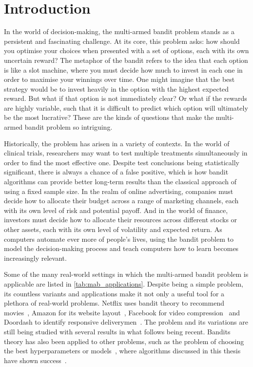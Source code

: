 \chapter{Introduction}
In the world of decision-making, the multi-armed bandit problem stands as a persistent and fascinating challenge.
At its core, this problem asks: how should you optimise your choices when presented with a set of options, each with its own uncertain reward?
The metaphor of the bandit refers to the idea that each option is like a slot machine, where you must decide how much to invest in each one in order to maximise your winnings over time.
One might imagine that the best strategy would be to invest heavily in the option with the highest expected reward.
But what if that option is not immediately clear?
Or what if the rewards are highly variable, such that it is difficult to predict which option will ultimately be the most lucrative?
These are the kinds of questions that make the multi-armed bandit problem so intriguing.

Historically, the problem has arisen in a variety of contexts.
In the world of clinical trials, researchers may want to test multiple treatments simultaneously in order to find the most effective one.
Despite test conclusions being statistically significant, there is always a chance of a false positive, which is how bandit algorithms can provide better long-term results than the classical approach of using a fixed sample size.
In the realm of online advertising, companies must decide how to allocate their budget across a range of marketing channels, each with its own level of risk and potential payoff.
And in the world of finance, investors must decide how to allocate their resources across different stocks or other assets, each with its own level of volatility and expected return.
As computers automate ever more of people's lives, using the bandit problem to model the decision-making process and teach computers how to learn becomes increasingly relevant.

Some of the many real-world settings in which the multi-armed bandit problem is applicable are listed in \cref{tab:mab_applications}.
Despite being a simple problem, its countless variants and applications make it not only a useful tool for a plethora of real-world problems.
Netflix uses bandit theory to recommend movies~\autocite{kawale2018}, Amazon for its website layout~\autocite{hill2017}, Facebook for video compression~\autocite{daulton2019} and Doordash to identify responsive deliverymen~\autocite{sharma2022}.
The problem and its variations are still being studied with several results in what follows being recent.
Bandits theory has also been applied to other problems, such as the problem of choosing the best hyperparameters or models~\autocite{gagliolo2010}, where algorithms discussed in this thesis have shown success~\autocite{wang2014,bouneffouf2017}.


